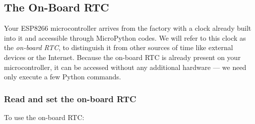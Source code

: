 \subsection{The On-Board RTC}
Your ESP8266 microcontroller arrives from the factory with a clock already built into it and accessible through MicroPython codes. 
We will refer to this clock as the \emph{on-board RTC}, to distinguish it from other sources of time like external devices or the Internet.
Because the on-board RTC is already present on your microcontroller, it can be accessed without any additional hardware --- we need only execute a few Python commands. 

\subsubsection{\howto Read and set the on-board RTC}
To use the on-board RTC:

